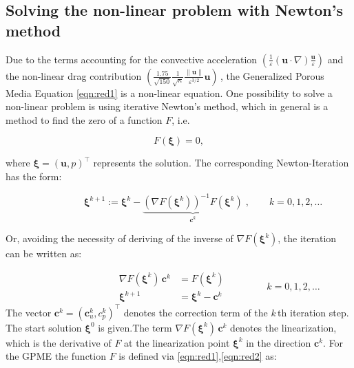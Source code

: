 \documentclass{article}
\newcommand{\norm}[1]{\lVert#1\rVert}
\newcommand{\vect}[1]{\mathbf{#1}}
\newcommand{\bol}[1]{\boldsymbol{#1}}
\begin{document}
\subsection{Solving the non-linear problem with Newton's method}

Due to the terms accounting for the convective acceleration $\left(\frac{1}{\varepsilon} \left(\vect u \cdot \nabla \right) \frac{\vect u}{\varepsilon}\right)$ and the non-linear drag contribution $\left(\frac{1.75}{\sqrt{150}} \frac{1}{\sqrt{\kappa}} \frac{\norm{\vect u}}{\varepsilon^{3/2}}\vect u\right)$\,, the Generalized Porous Media Equation \eqref{eqn:red1} is a non-linear equation. One possibility to solve a non-linear problem is using iterative Newton’s method, which in general is a method to find the zero of a function $F$, i.e.

\begin{equation*}
 F(\bol \xi)=0,
\end{equation*}

 where $\bol \xi=(\vect u,p)^{\top}$ represents the solution. The corresponding Newton-Iteration has the form:

\begin{equation*}
\quad\qquad\qquad \bol \xi ^ {k+1} := \bol \xi ^ {k} - \underbrace{(\nabla F (\bol \xi ^ {k})) ^ {-1}F(\bol \xi ^{k})}_{ \vect c^k} \;,\quad\quad k=0,1,2,\dots
\label{eqn:Newton} 
\end{equation*}

Or, avoiding the necessity of deriving of the inverse of $\nabla F (\bol \xi ^ {k})$, the iteration can be written as:

\begin{equation}\label{eqn:NewtonApp}
\qquad\qquad\qquad\qquad \left.\begin{aligned}
        \nabla F (\bol \xi ^ {k}) \, \vect c^k &= F (\bol \xi ^k) \\
        \bol \xi ^ {k+1} &= \bol \xi ^{k} - \vect c^k 
       \end{aligned}
 \right. \qquad\qquad k=0,1,2,\dots
\end{equation}
The vector $\vect c^k =(\vect c_u^k,c_p^k)^{\top}$ denotes the correction term of the $k\,$th iteration step. The start solution $\bol \xi^0$ is given.The term $\nabla F(\bol \xi^k)\,\vect c^k$ denotes the linearization, which is the derivative of $F$ at the linearization point $\bol \xi^k$ in the direction
$\vect c^k$. For the GPME the function $F$ is defined via \eqref{eqn:red1},\eqref{eqn:red2} as:
\end{document}

